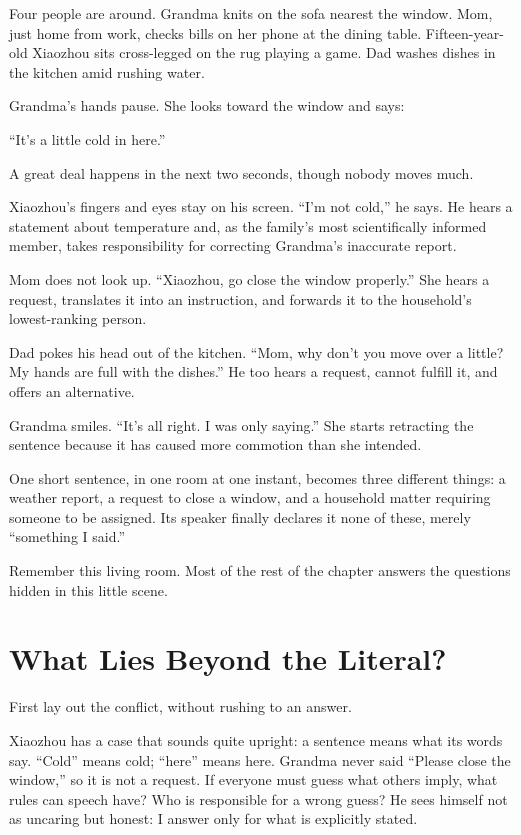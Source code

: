 Four people are around. Grandma knits on the sofa nearest the window. Mom, just home from work, checks bills on her phone at the dining table. Fifteen-year-old Xiaozhou sits cross-legged on the rug playing a game. Dad washes dishes in the kitchen amid rushing water.

Grandma's hands pause. She looks toward the window and says:

``It's a little cold in here.''

A great deal happens in the next two seconds, though nobody moves much.

Xiaozhou's fingers and eyes stay on his screen. ``I'm not cold,'' he says. He hears a statement about temperature and, as the family's most scientifically informed member, takes responsibility for correcting Grandma's inaccurate report.

Mom does not look up. ``Xiaozhou, go close the window properly.'' She hears a request, translates it into an instruction, and forwards it to the household's lowest-ranking person.

Dad pokes his head out of the kitchen. ``Mom, why don't you move over a little? My hands are full with the dishes.'' He too hears a request, cannot fulfill it, and offers an alternative.

Grandma smiles. ``It's all right. I was only saying.'' She starts retracting the sentence because it has caused more commotion than she intended.

One short sentence, in one room at one instant, becomes three different things: a weather report, a request to close a window, and a household matter requiring someone to be assigned. Its speaker finally declares it none of these, merely ``something I said.''

Remember this living room. Most of the rest of the chapter answers the questions hidden in this little scene.

\section{What Lies Beyond the Literal?}
First lay out the conflict, without rushing to an answer.

Xiaozhou has a case that sounds quite upright: a sentence means what its words say. ``Cold'' means cold; ``here'' means here. Grandma never said ``Please close the window,'' so it is not a request. If everyone must guess what others imply, what rules can speech have? Who is responsible for a wrong guess? He sees himself not as uncaring but honest: I answer only for what is explicitly stated.

